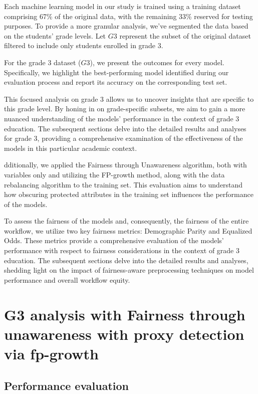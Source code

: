 \documentclass[12pt,a4paper,openright,twoside]{book}
\begin{document}
Each machine learning model in our study is trained using a training dataset comprising 67\% of the original data, with the remaining 33\% reserved for testing purposes. To provide a more granular analysis, we've segmented the data based on the students' grade levels. Let \( G3 \) represent the subset of the original dataset filtered to include only students enrolled in grade 3.

For the grade 3 dataset (\( G3 \)), we present the outcomes for every model. Specifically, we highlight the best-performing model identified during our evaluation process and report its accuracy on the corresponding test set.

This focused analysis on grade 3 allows us to uncover insights that are specific to this grade level. By honing in on grade-specific subsets, we aim to gain a more nuanced understanding of the models' performance in the context of grade 3 education. The subsequent sections delve into the detailed results and analyses for grade 3, providing a comprehensive examination of the effectiveness of the models in this particular academic context.

dditionally, we applied the Fairness through Unawareness algorithm, both with variables only and utilizing the FP-growth method, along with the data rebalancing algorithm to the training set. This evaluation aims to understand how obscuring protected attributes in the training set influences the performance of the models.

To assess the fairness of the models and, consequently, the fairness of the entire workflow, we utilize two key fairness metrics: Demographic Parity and Equalized Odds. These metrics provide a comprehensive evaluation of the models' performance with respect to fairness considerations in the context of grade 3 education. The subsequent sections delve into the detailed results and analyses, shedding light on the impact of fairness-aware preprocessing techniques on model performance and overall workflow equity.

\section{G3 analysis with Fairness through unawareness with proxy detection via fp-growth}

\subsection{Performance evaluation}
\end{document}

